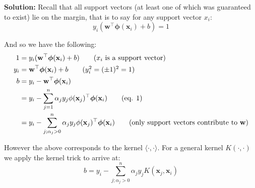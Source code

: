 \documentclass{article}
\renewcommand{\vec}[1]{\mathbf{#1}}
\begin{document}
\noindent\textbf{Solution:} Recall that all support vectors (at least one of which was guaranteed to exist) lie on the margin, that is to say for any support vector $x_i$:
$$y_i(\vec w^\top\bm\phi(\vec x_i)+b)=1$$

And so we have the following:
\begin{align*}
    1&=y_i(\vec w^\top\bm\phi(\vec x_i)+b)\tag{$x_i$ is a support vector}\\
    y_i&=\vec w^\top\bm\phi(\vec x_i)+b\tag{$y_i^2=(\pm1)^2=1$}\\
    b&=y_i-\vec w^\top\bm\phi(\vec x_i)\\
    &=y_i-\sum_{j=1}^n\alpha_jy_j\phi(\vec x_j)^\top\bm\phi(\vec x_i)\tag{eq. 1}\\
    &=y_i-\sum_{j;\alpha_j>0}^n\alpha_jy_j\phi(\vec x_j)^\top\bm\phi(\vec x_i)\tag{only support vectors contribute to $\vec w$}
\end{align*}

However the above corresponds to the kernel $\langle\cdot,\cdot\rangle$. For a general kernel $K(\cdot,\cdot)$ we apply the kernel trick to arrive at:
$$b=y_i-\sum_{j;\alpha_j>0}^n\alpha_jy_jK(\vec x_j,\vec x_i)$$
\end{document}

